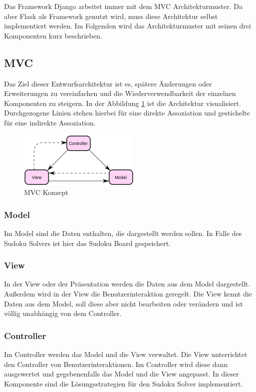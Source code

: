 Das Framework Django arbeitet immer mit dem \ac{MVC} Architekturmuster. Da aber Flask als Framework genutzt wird, muss diese Architektur selbst implementiert werden. Im Folgenden wird das Architekturmuster mit seinen drei Komponenten kurz beschrieben.

\subsection{\acl{MVC}}
Das Ziel dieser Entwurfsarchitektur ist es, spätere Änderungen oder Erweiterungen zu vereinfachen und die Wiederverwendbarkeit der einzelnen Komponenten zu steigern. In der Abbildung \ref{fig:MVC} ist die Architektur visualisiert. Durchgezogene Linien stehen hierbei für eine direkte Assoziation und gestichelte für eine indirekte Assoziation.  

\begin{figure}[htbp]
	\centering
	\includegraphics{images/MVC.png}
	\caption{\ac{MVC} Konzept}
	\label{fig:MVC}
\end{figure}

\subsubsection{Model}
Im Model sind die Daten enthalten, die dargestellt werden sollen. In Falle des Sudoku Solvers ist hier das Sudoku Board gespeichert.
\subsubsection{View}
In der View oder der Präsentation werden die Daten aus dem Model dargestellt. Außerdem wird in der View die Benutzerinteraktion geregelt. Die View kennt die Daten aus dem Model, soll diese aber nicht bearbeiten oder verändern und ist völlig unabhängig von dem Controller.
\subsubsection{Controller}
Im Controller werden das Model und die View verwaltet. Die View unterrichtet den Controller von Benutzerinteraktionen. Im Controller wird diese dann ausgewertet und gegebenenfalls das Model und die View angepasst.  In dieser Komponente sind die Lösungsstrategien für den Sudoku Solver implementiert.
